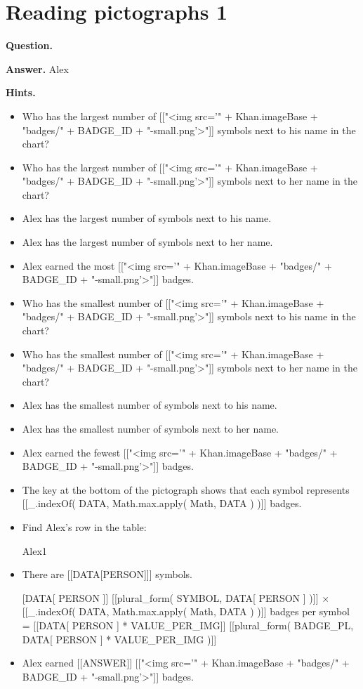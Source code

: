 \documentclass{article}
\begin{document}
\section*{Reading pictographs 1}
\textbf{Question.} 

\textbf{Answer.} Alex

\textbf{Hints.}
\begin{itemize}
  \item Who has the largest number of [["<img src='" + Khan.imageBase + "badges/" + BADGE\_ID + "-small.png'>"]] symbols next to his name in the chart?
  \item Who has the largest number of [["<img src='" + Khan.imageBase + "badges/" + BADGE\_ID + "-small.png'>"]] symbols next to her name in the chart?
  \item Alex has the largest number of symbols next to his name.
  \item Alex has the largest number of symbols next to her name.
  \item Alex earned the most [["<img src='" + Khan.imageBase + "badges/" + BADGE\_ID + "-small.png'>"]] badges.
  \item Who has the smallest number of [["<img src='" + Khan.imageBase + "badges/" + BADGE\_ID + "-small.png'>"]] symbols next to his name in the chart?
  \item Who has the smallest number of [["<img src='" + Khan.imageBase + "badges/" + BADGE\_ID + "-small.png'>"]] symbols next to her name in the chart?
  \item Alex has the smallest number of symbols next to his name.
  \item Alex has the smallest number of symbols next to her name.
  \item Alex earned the fewest [["<img src='" + Khan.imageBase + "badges/" + BADGE\_ID + "-small.png'>"]] badges.
  \item The key at the bottom of the pictograph shows that each symbol represents [[\_.indexOf( DATA, Math.max.apply( Math, DATA ) )]] badges.
  \item Find Alex's row in the table:
                    
                        Alex1
  \item There are [[DATA[PERSON]]] symbols.
  \item [[DATA[ PERSON ]]] [[plural\_form( SYMBOL, DATA[ PERSON ] )]]
                         $\times$  [[\_.indexOf( DATA, Math.max.apply( Math, DATA ) )]] badges per symbol
                         = [[DATA[ PERSON ] * VALUE\_PER\_IMG]]
                        [[plural\_form( BADGE\_PL, DATA[ PERSON ] * VALUE\_PER\_IMG )]]
  \item Alex earned [[ANSWER]] [["<img src='" + Khan.imageBase + "badges/" + BADGE\_ID + "-small.png'>"]] badges.
\end{itemize}
\end{document}
